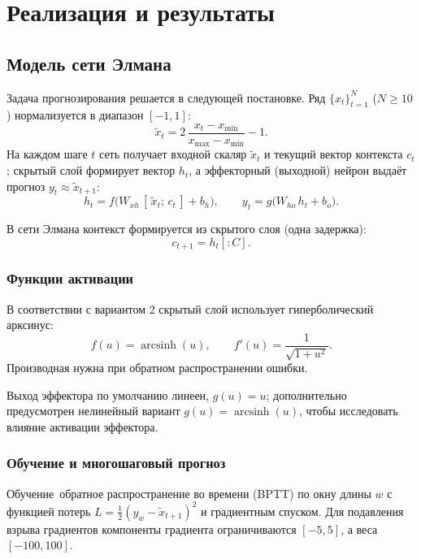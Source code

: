\section{Реализация и результаты}
\label{sec:work}

\subsection{Модель сети Элмана}

Задача прогнозирования решается в следующей постановке. Ряд $\{x_t\}_{t=1}^{N}$ ($N \ge 10$) нормализуется в диапазон $[-1, 1]$:
\begin{equation}
	\tilde{x}_t = 2\,\frac{x_t - x_{\min}}{x_{\max} - x_{\min}} - 1.
\end{equation}
На каждом шаге $t$ сеть получает входной скаляр $\tilde{x}_t$ и текущий вектор контекста $c_t$; скрытый слой формирует вектор $h_t$, а эффекторный (выходной) нейрон выдаёт прогноз $y_t \approx \tilde{x}_{t+1}$:
\begin{equation}
	h_t = f\bigl(W_{xh}\,[\,\tilde{x}_t;\, c_t\,] + b_h\bigr), \qquad
	y_t = g\bigl(W_{ho}\,h_t + b_o\bigr).
\end{equation}

В сети Элмана контекст формируется из скрытого слоя (одна задержка):
\begin{equation}
	c_{t+1} = h_t[:C].
\end{equation}

\subsubsection{Функции активации}

В соответствии с вариантом 2 скрытый слой использует гиперболический арксинус:
\begin{equation}
	f(u) = \operatorname{arcsinh}(u), \qquad f'(u) = \frac{1}{\sqrt{1+u^2}}.
\end{equation}
Производная нужна при обратном распространении ошибки.

Выход эффектора по умолчанию линеен, $g(u) = u$; дополнительно предусмотрен нелинейный вариант $g(u) = \operatorname{arcsinh}(u)$, чтобы исследовать влияние активации эффектора.

\subsubsection{Обучение и многошаговый прогноз}

Обучение~\mdash  обратное распространение во времени (BPTT) по окну длины $w$ с функцией потерь $L = \tfrac{1}{2}(y_w - \tilde{x}_{t+1})^2$ и градиентным спуском. Для подавления взрыва градиентов компоненты градиента ограничиваются $[-5, 5]$, а веса~\mdash  $[-100, 100]$.

